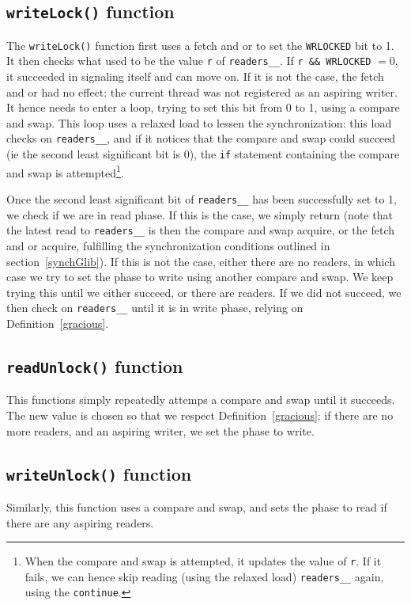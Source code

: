 		\subsection{\texttt{writeLock()} function}

		The \texttt{writeLock()} function first uses a fetch and or to set the \texttt{WRLOCKED} bit to 1. It then checks what used to be the value \texttt{r} of \texttt{readers\_\_}. If \texttt{r \&\& WRLOCKED} $= 0$, it succeeded in signaling itself and can move on. If it is not the case, the fetch and or had no effect: the current thread was not registered as an aspiring writer. It hence needs to enter a loop, trying to set this bit from 0 to 1, using a compare and swap. This loop uses a relaxed load to lessen the synchronization: this load checks on \texttt{readers\_\_}, and if it notices that the compare and swap could succeed (ie the second least significant bit is 0), the \texttt{if} statement containing the compare and swap is attempted\footnote{When the compare and swap is attempted, it updates the value of \texttt{r}. If it fails, we can hence skip reading (using the relaxed load) \texttt{readers\_\_} again, using the \texttt{continue}.}. 

		Once the second least significant bit of \texttt{readers\_\_} has been successfully set to 1, we check if we are in read phase. If this is the case, we simply return (note that the latest read to \texttt{readers\_\_} is then the compare and swap acquire, or the fetch and or acquire, fulfilling the synchronization conditions outlined in section~\ref{synchGlib}). If this is not the case, either there are no readers, in which case we try to set the phase to write using another compare and swap. We keep trying this until we either succeed, or there are readers. If we did not succeed, we then check on \texttt{readers\_\_} until it is in write phase, relying on Definition~\ref{gracious}.

		\subsection{\texttt{readUnlock()} function}

		This functions simply repeatedly attemps a compare and swap until it succeeds. The new value is chosen so that we respect Definition~\ref{gracious}: if there are no more readers, and an aspiring writer, we set the phase to write.

		\subsection{\texttt{writeUnlock()} function}

		Similarly, this function uses a compare and swap, and sets the phase to read if there are any aspiring readers.
